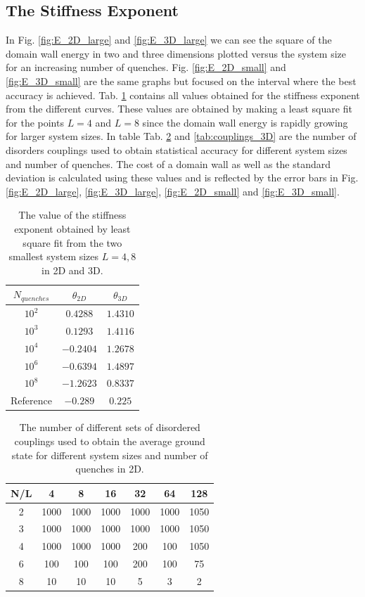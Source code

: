 \documentclass[paper=a4, fontsize=11pt]{scrartcl} %
\numberwithin{equation}{section} %
\numberwithin{figure}{section} %
\numberwithin{table}{section} %
\begin{document}
\subsection{The Stiffness Exponent}
In Fig. \ref{fig:E_2D_large} and \ref{fig:E_3D_large} we can see the square of the domain wall energy in two and three dimensions plotted versus the system size for an increasing number of quenches. Fig. \ref{fig:E_2D_small} and \ref{fig:E_3D_small} are the same graphs but focused on the interval where the best accuracy is achieved. Tab. \ref{tab:stiffness_exponent} contains all values obtained for the stiffness exponent from the different curves. These values are obtained by making a least square fit for the points $L=4$ and $L=8$ since the domain wall energy is rapidly growing for larger system sizes. In table Tab. \ref{tab:couplings_2D} and \ref{tab:couplings_3D} are the number of disorders couplings used to obtain statistical accuracy for different system sizes and number of quenches. The cost of a domain wall as well as the standard deviation is calculated using these values and is reflected by the error bars in Fig. \ref{fig:E_2D_large}, \ref{fig:E_3D_large}, \ref{fig:E_2D_small} and \ref{fig:E_3D_small}.

\begin{table}[h]
\centering
  \begin{tabular}{| c | c | c |}
    \hline
    $N_{quenches}$ & $\theta_{2D}$ & $\theta_{3D}$ \\ \hline
    $10^2$ & $0.4288$ & $1.4310$ \\ \hline
    $10^3$ & $0.1293$ & $1.4116$ \\ \hline
    $10^4$ & $-0.2404$ & $1.2678$ \\ \hline
    $10^6$ & $-0.6394$ & $1.4897$ \\ \hline
    $10^8$ & $-1.2623$ & $0.8337$ \\ \hline
    Reference & $-0.289$ & $0.225$ \\ \hline
  \end{tabular}
  \caption{The value of the stiffness exponent obtained by least square fit from the two smallest system sizes $L=4,8$ in 2D and 3D.}
  \label{tab:stiffness_exponent}
\end{table}

\begin{table}[h]
\centering
  \begin{tabular}{| c | c | c | c | c | c | c |}
    \hline
    N/L & 4 & 8 & 16 & 32 & 64 & 128 \\ \hline
	2 & 1000 & 1000 & 1000 & 1000 & 1000 & 1050 \\ \hline
	3 & 1000 & 1000 & 1000 & 1000 & 1000 & 1050 \\ \hline
	4 & 1000 & 1000 & 1000 & 200 & 100 & 1050 \\ \hline
	6 & 100 & 100 & 100 & 200 & 100 & 75 \\ \hline
	8 & 10 & 10 & 10 & 5 & 3 & 2 \\ \hline
  \end{tabular}
  \caption{The number of different sets of disordered couplings used to obtain the average ground state for different system sizes and number of quenches in 2D.}
  \label{tab:couplings_2D}
\end{table}
\end{document}
